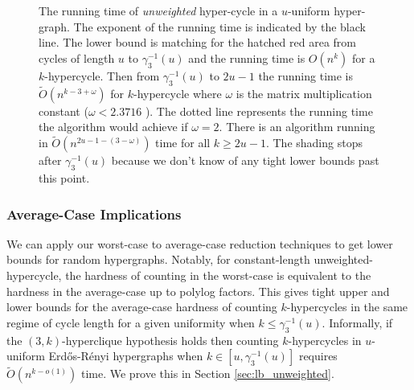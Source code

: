 \documentclass[11pt,letterpaper,pdftex]{article}
\begin{document}
\begin{figure} [ht]
    \centering
    \caption{The running time of \textit{unweighted} hyper-cycle in a $u$-uniform hyper-graph. The exponent of the running time is indicated by the black line. The lower bound is matching for the hatched red area from cycles of length $u$ to $\gamma_3^{-1}(u)$ and the running time is $O(n^k)$ for a $k$-hypercycle. Then from $\gamma_3^{-1}(u)$ to $2u-1$ the running time is $\tilde{O}(n^{k-3+\omega})$ for $k$-hypercycle where $\omega$ is the matrix multiplication constant ($\omega < 2.3716$ \cite{mmConstantOmega}). The dotted line represents the running time the algorithm would achieve if $\omega=2$. There is an algorithm running in $\tilde{O}(n^{2u-1-(3-\omega)})$ time for all $k \geq 2u-1$. The shading stops after $\gamma_3^{-1}(u)$ because we don't know of any tight lower bounds past this point. }
    \label{fig:unweightedHypercycleBounds}
\end{figure}


\subsubsection{Average-Case Implications}
We can apply our worst-case to average-case reduction techniques to get lower bounds for random hypergraphs. 
Notably, for constant-length unweighted-hypercycle, the hardness of counting in the worst-case is equivalent to the hardness in the average-case up to polylog factors. 
This gives tight upper and lower bounds for the average-case hardness of counting $k$-hypercycles in the same regime of cycle length for a given uniformity when $k \leq \gamma_3^{-1}(u)$. Informally, if the $(3,k)$-hyperclique hypothesis holds then counting $k$-hypercycles in $u$-uniform Erd{\H{o}}s-R{\'{e}}nyi hypergraphs when $k \in [u, \gamma_3^{-1}(u)]$ requires $\tilde{O}(n^{k-o(1)})$ time. We prove this in Section \ref{sec:lb_unweighted}.
\end{document}
